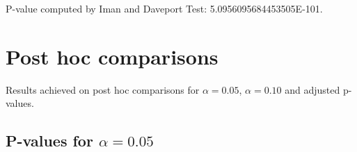 \documentclass[a4paper,10pt]{article}
\begin{document}
\begin{landscape}
P-value computed by Iman and Daveport Test: 5.0956095684453505E-101.\newline



\pagebreak

\section{Post hoc comparisons}

Results achieved on post hoc comparisons for $\alpha = 0.05$, $\alpha = 0.10$ and adjusted p-values.

\subsection{P-values for $\alpha=0.05$}


\end{landscape}
\end{document}
